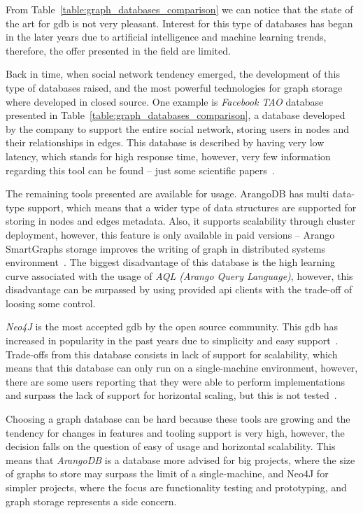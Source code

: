 From Table~\ref{table:graph_databases_comparison} we can notice that the state of the art for \gls{gdb} is not very pleasant. Interest for this type of databases has began in the later years due to artificial intelligence and machine learning trends, therefore, the offer presented in the field are limited.

Back in time, when social network tendency emerged, the development of this type of databases raised, and the most powerful technologies for graph storage where developed in closed source. One example is \emph{Facebook TAO} database presented in Table~\ref{table:graph_databases_comparison}, a database developed by the company to support the entire social network, storing users in nodes and their relationships in edges. This database is described by having very low latency, which stands for high response time, however, very few information regarding this tool can be found -- just some scientific papers~\cite{facebook_tao_article,Facebook2150}.

The remaining tools presented are available for usage. ArangoDB has multi data-type support, which means that a wider type of data structures are supported for storing in nodes and edges metadata. Also, it supports scalability through cluster deployment, however, this feature is only available in paid versions -- Arango SmartGraphs storage improves the writing of graph in distributed systems environment~\cite{arangodb_smart_graphs}. The biggest disadvantage of this database is the high learning curve associated with the usage of \emph{AQL (Arango Query Language)}, however, this disadvantage can be surpassed by using provided \gls{api} clients with the trade-off of loosing some control.

\emph{Neo4J} is the most accepted \gls{gdb} by the open source community. This \gls{gdb} has increased in popularity in the past years due to simplicity and easy support~\cite{Turu2017}. Trade-offs from this database consists in lack of support for scalability, which means that this database can only run on a single-machine environment, however, there are some users reporting that they were able to perform implementations and surpass the lack of support for horizontal scaling, but this is not tested~\cite{neo4j_scalable}.

Choosing a graph database can be hard because these tools are growing and the tendency for changes in features and tooling support is very high, however,  the decision falls on the question of easy of usage and horizontal scalability. This means that \emph{ArangoDB} is a database more advised for big projects, where the size of graphs to store may surpass the limit of a single-machine, and Neo4J for simpler projects, where the focus are functionality testing and prototyping, and graph storage represents a side concern.

